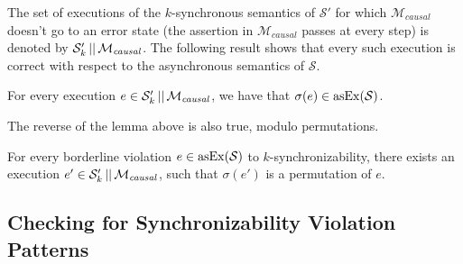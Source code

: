 The set of executions of the $k$-synchronous semantics of $\mathcal{S'}$ for which $\mathcal{M}_{\mathit{causal}}$ doesn't go to an error state (the assertion in $\mathcal{M}_{\mathit{causal}}$ passes at every step) is denoted by $\mathcal{S}_k' \,||\,\mathcal{M}_{\mathit{causal}}$. The following result shows that every such execution is correct with respect to the asynchronous semantics of $\mathcal{S}$.

\begin{lemma}
For every execution $e\in \mathcal{S}_k' \,||\,\mathcal{M}_{\mathit{causal}}$, we have that $\sigma(e)\in \mathrm{asEx}({\mathcal{S}})$.
\end{lemma}

The reverse of the lemma above is also true, modulo permutations.

\begin{lemma}
For every borderline violation $e\in \mathrm{asEx}({\mathcal{S}})$ to $k$-synchronizability, there exists an execution $e'\in \mathcal{S}_k' \,||\,\mathcal{M}_{\mathit{causal}}$, such that $\sigma(e')$ is a permutation of $e$.
\end{lemma}



\subsection{Checking for Synchronizability Violation Patterns}\label{ssec:verif4}

